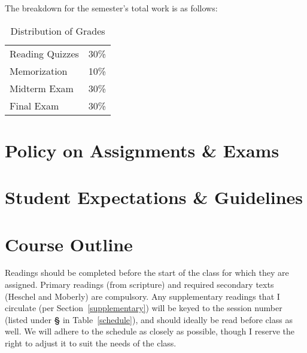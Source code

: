 \documentclass[titlepage]{article}
\newcommand\policy{../policy}
\begin{document}
The breakdown for the semester's total work is as follows:

\begin{table}[htbp]
  \centering
  {\lining
  \begin{tabular}{lr}
    \toprule
    Reading Quizzes & 30\% \\
    Memorization    & 10\% \\
    Midterm Exam    & 30\% \\
    Final Exam      & 30\% \\
    \bottomrule
  \end{tabular}}
  \caption{Distribution of Grades}
  \label{distribution}
\end{table}



\section{Policy on Assignments \& Exams}
\label{policy}





\section{Student Expectations \& Guidelines}
\label{expectations}







\section{Course Outline}
\label{outline}

Readings should be completed before the start of the class for which
they are assigned. Primary readings (from scripture) and required
secondary texts (Heschel and Moberly) are compulsory. Any supplementary
readings that I circulate (per Section~\ref{supplementary}) will be
keyed to the session number (listed under \textbf{\S} in
Table~\ref{schedule}), and should ideally be read before class as well.
We will adhere to the schedule as closely as possible, though I reserve
the right to adjust it to suit the needs of the class.
\end{document}
